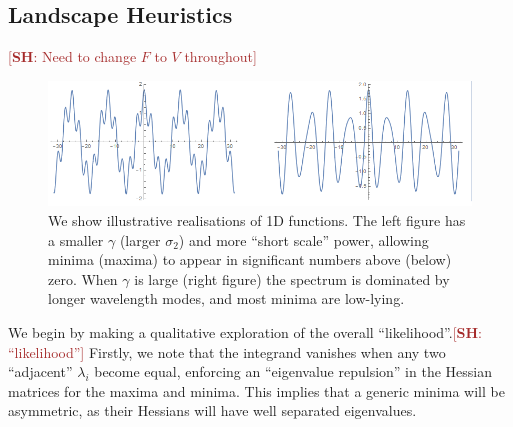 \documentclass[12pt]{article}
\newcommand{\re}[1]{\textcolor{blue}{[{\bf RE}: #1]}}
\newcommand{\lfl}[1]{\textcolor{red}{[{\bf LL}: #1]}}
\newcommand{\SH}[1]{\textcolor{brown}{[{\bf SH}: #1]}}
\begin{document}




\subsection{Landscape Heuristics}
\SH{Need to change $F$ to $V$ throughout}
\begin{figure}
  \centering
  
  \includegraphics[width=\linewidth]{TwoSigmas.png}
  \caption{We show illustrative realisations of 1D functions. The left figure has a smaller $\gamma$ (larger $\sigma_2$) and more “short scale” power, allowing minima (maxima) to appear in significant numbers above (below) zero. When $\gamma$ is large (right figure) the spectrum is dominated by longer wavelength modes, and most minima are low-lying.}
  \label{examples1}
\end{figure}

We begin by making a qualitative exploration of the overall ``likelihood''.\SH{``likelihood''} Firstly, we note that the integrand vanishes when any two ``adjacent'' $\lambda_i$ become equal, enforcing an ``eigenvalue repulsion'' in the Hessian matrices for the maxima and minima. This implies that a generic minima will be asymmetric, as their Hessians will have well separated eigenvalues.   
\end{document}
